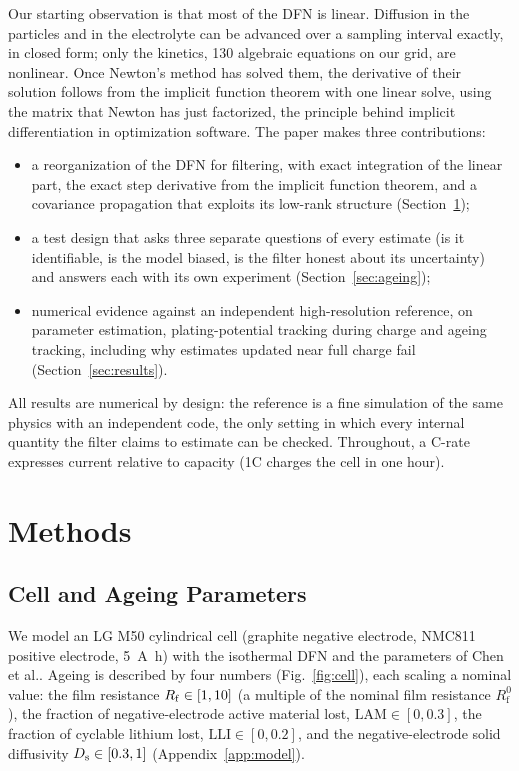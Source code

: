 \documentclass[journal]{IEEEtran}
\newcommand{\LAM}{\mathrm{LAM}}\newcommand{\LLI}{\mathrm{LLI}}\newcommand{\phipl}{\phi_{\mathrm{pl}}}
\begin{document}
Our starting observation is that most of the DFN is linear. Diffusion in the particles and in the electrolyte can be advanced over a sampling interval exactly, in closed form; only the kinetics, 130 algebraic equations on our grid, are nonlinear. Once Newton's method has solved them, the derivative of their solution follows from the implicit function theorem with one linear solve, using the matrix that Newton has just factorized, the principle behind implicit differentiation in optimization software\cite{andersson2019,blondel2022}. The paper makes three contributions:
\begin{itemize}
\item a reorganization of the DFN for filtering, with exact integration of the linear part, the exact step derivative from the implicit function theorem, and a covariance propagation that exploits its low-rank structure (Section~\ref{sec:model});
\item a test design that asks three separate questions of every estimate (is it identifiable, is the model biased, is the filter honest about its uncertainty) and answers each with its own experiment (Section~\ref{sec:ageing});
\item numerical evidence against an independent high-resolution reference, on parameter estimation, plating-potential tracking during charge and ageing tracking, including why estimates updated near full charge fail (Section~\ref{sec:results}).
\end{itemize}
All results are numerical by design: the reference is a fine simulation of the same physics with an independent code\cite{pybamm}, the only setting in which every internal quantity the filter claims to estimate can be checked. Throughout, a C-rate expresses current relative to capacity (1C charges the cell in one hour).

\section{Methods}\label{sec:model}

\subsection{Cell and Ageing Parameters}
We model an LG M50 cylindrical cell (graphite negative electrode, NMC811 positive electrode, \SI{5}{\ampere\hour}) with the isothermal DFN and the parameters of Chen et al.\cite{chen2020}. Ageing is described by four numbers (Fig.~\ref{fig:cell}), each scaling a nominal value: the film resistance $R_{\mathrm{f}}\in[1,10]$ (a multiple of the nominal film resistance $R^{0}_{\mathrm f}$), the fraction of negative-electrode active material lost, $\LAM\in[0,0.3]$, the fraction of cyclable lithium lost, $\LLI\in[0,0.2]$, and the negative-electrode solid diffusivity $D_{\mathrm{s}}\in[0.3,1]$ (Appendix~\ref{app:model}).
\end{document}
